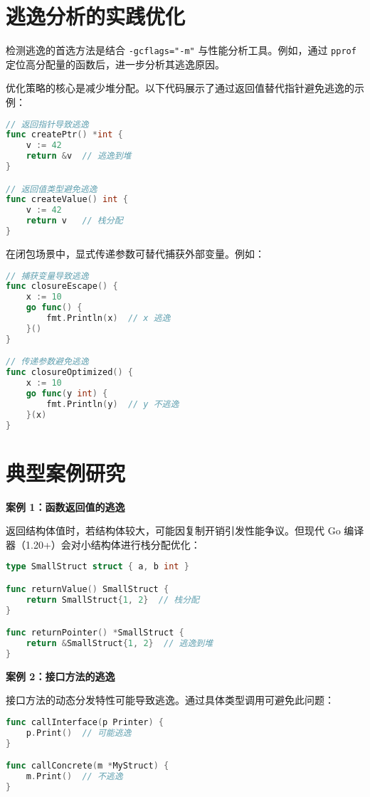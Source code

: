 \chapter{逃逸分析的实践优化}
检测逃逸的首选方法是结合 \verb!-gcflags="-m"! 与性能分析工具。例如，通过 \verb!pprof! 定位高分配量的函数后，进一步分析其逃逸原因。\par
优化策略的核心是减少堆分配。以下代码展示了通过返回值替代指针避免逃逸的示例：\par
\begin{lstlisting}[language=go]
// 返回指针导致逃逸
func createPtr() *int {
    v := 42
    return &v  // 逃逸到堆
}

// 返回值类型避免逃逸
func createValue() int {
    v := 42
    return v   // 栈分配
}
\end{lstlisting}
在闭包场景中，显式传递参数可替代捕获外部变量。例如：\par
\begin{lstlisting}[language=go]
// 捕获变量导致逃逸
func closureEscape() {
    x := 10
    go func() {
        fmt.Println(x)  // x 逃逸
    }()
}

// 传递参数避免逃逸
func closureOptimized() {
    x := 10
    go func(y int) {
        fmt.Println(y)  // y 不逃逸
    }(x)
}
\end{lstlisting}
\chapter{典型案例研究}
\textbf{案例 1：函数返回值的逃逸}\par
返回结构体值时，若结构体较大，可能因复制开销引发性能争议。但现代 Go 编译器（1.20+）会对小结构体进行栈分配优化：\par
\begin{lstlisting}[language=go]
type SmallStruct struct { a, b int }

func returnValue() SmallStruct {
    return SmallStruct{1, 2}  // 栈分配
}

func returnPointer() *SmallStruct {
    return &SmallStruct{1, 2}  // 逃逸到堆
}
\end{lstlisting}
\textbf{案例 2：接口方法的逃逸}\par
接口方法的动态分发特性可能导致逃逸。通过具体类型调用可避免此问题：\par
\begin{lstlisting}[language=go]
func callInterface(p Printer) {
    p.Print()  // 可能逃逸
}

func callConcrete(m *MyStruct) {
    m.Print()  // 不逃逸
}
\end{lstlisting}
